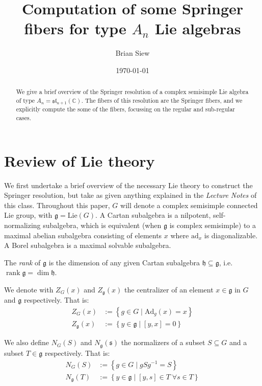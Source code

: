 \documentclass[11pt]{article}
\title{Computation of some Springer fibers for type $A_n$ Lie algebras}
\author{Brian Siew}
\date{\today}
\newcommand{\C}{\mathbb{C}}
\newcommand{\rk}{\operatorname{rank}}
\theoremstyle{definition}
\numberwithin{equation}{section} %
\begin{document}
\maketitle

\begin{abstract}
We give a brief overview of the Springer resolution of a complex semisimple Lie algebra of type $A_n = \mathfrak{sl}_{n+1}(\C)$. The fibers of this resolution are the Springer fibers, and we explicitly compute the some of the fibers, focussing on the regular and sub-regular cases.  
\end{abstract}

\tableofcontents
\newpage

\section{Review of Lie theory}
We first undertake a brief overview of the necessary Lie theory to construct the Springer resolution, but take as given anything explained in the \emph{Lecture Notes} of this class. Throughout this paper, $G$ will denote a complex semisimple connected Lie group, with $\mathfrak{g} = \mathrm{Lie}(G)$. A Cartan subalgebra is a nilpotent, self-normalizing subalgebra, which is equivalent (when $\mathfrak{g}$ is complex semisimple) to a maximal abelian subalgebra consisting of elements $x$ where $\mathrm{ad}_x$ is diagonalizable. A Borel subalgebra is a maximal solvable subalgebra.

\begin{definition}
    The \emph{rank} of $\mathfrak{g}$ is the dimension of any given Cartan subalgebra $\mathfrak{h}\subseteq\mathfrak{g}$, i.e. $\rk \mathfrak{g} = \dim \mathfrak{h}$.
\end{definition}

\noindent We denote with $Z_G(x)$ and $Z_\mathfrak{g}(x)$ the centralizer of an element $x\in \mathfrak{g}$ in $G$ and $\mathfrak{g}$ respectively. That is:
\begin{align*}
    Z_G(x) &:= \left\{g\in G \mid \mathrm{Ad}_g(x) =x  \right\} \\
    Z_\mathfrak{g}(x) &:= \left\{y\in \mathfrak{g} \mid [y,x] =0\right\}
\end{align*}

\noindent We also define $N_G(S)$ and $N_\mathfrak{g}(\mathfrak{s})$ the normalizers of a subset $S\subseteq G$ and a subset $T\in \mathfrak{g}$ respectively. That is:
\begin{align*}
    N_G(S) &:= \left\{g\in G \mid gSg^{-1}=S  \right\} \\
    N_\mathfrak{g}(T) &:= \left\{y\in \mathfrak{g} \mid [y,s] \in T \; \forall s\in T\right\}
\end{align*}
\end{document}
